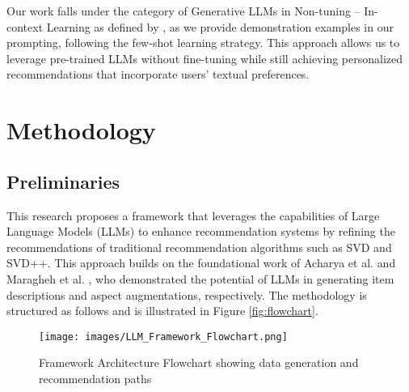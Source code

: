 \documentclass[sigconf]{acmart}
\begin{document}
Our work falls under the category of Generative LLMs in Non-tuning – In-context Learning as defined by \cite{wu2024survey}, as we provide demonstration examples in our prompting, following the few-shot learning strategy. This approach allows us to leverage pre-trained LLMs without fine-tuning while still achieving personalized recommendations that incorporate users' textual preferences.

\section{Methodology}
\subsection{Preliminaries}
This research proposes a framework that leverages the capabilities of Large Language Models (LLMs) to enhance recommendation systems by refining the recommendations of traditional recommendation algorithms such as SVD and SVD++. This approach builds on the foundational work of Acharya et al. \cite{AcharyaLLM2023} and Maragheh et al. \cite{yousefi2024llm}, who demonstrated the potential of LLMs in generating item descriptions and aspect augmentations, respectively. The methodology is structured as follows and is illustrated in Figure \ref{fig:flowchart}.

\begin{figure*}
    \centering
    \texttt{[image: images/LLM\_Framework\_Flowchart.png]}
    \caption{Framework Architecture Flowchart showing data generation and recommendation paths}
    \label{fig:system-flowchart}
\end{figure*}
\end{document}
